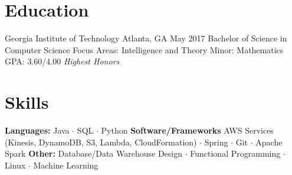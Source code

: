\documentclass{resume_template}
\begin{document}
  
	
	\noindent{}

	\section{Education}
 		\noindent\education
		{Georgia Institute of Technology}
		{Atlanta, GA}
		{May 2017}
		{Bachelor of Science in Computer Science}
		{Focus Areas: Intelligence and Theory}
		{Minor: Mathematics}
		{GPA: 3.60/4.00 \textit{Highest Honors}}
	\section{Skills}
	\noindent\textbf{Languages:} Java $\cdot$ SQL $\cdot$ Python \newline
	\textbf{Software/Frameworks} AWS Services (Kinesis, DynamoDB, S3, Lambda, CloudFormation) $\cdot$ Spring $\cdot$ Git $\cdot$ Apache Spark \newline
	\textbf{Other:} Database/Data Warehouse Design $\cdot$ Functional Programming $\cdot$ Linux $\cdot$ Machine Learning

	
\end{document}
